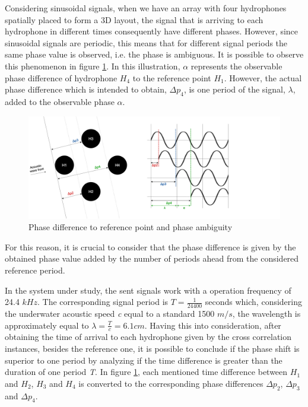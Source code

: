Considering sinusoidal signals, when we have an array with four hydrophones spatially placed to form a 3D layout, the signal that is arriving to each  hydrophone in different times consequently have different phases. However, since sinusoidal signals are periodic, this means that for different signal periods the same phase value is observed, i.e. the phase is ambiguous. It is possible to observe this phenomenon in figure \ref{fig:phasediff}. In this illustration, $\alpha$ represents the observable phase difference of hydrophone $H_4$ to the reference point $H_1$. However, the actual phase difference which is intended to obtain, $\Delta p_4$, is one period of the signal, $\lambda$, added to the observable phase $\alpha$.

\begin{figure}[!htbp]
	\centering
	\includegraphics[width=1.2\textwidth]{figures/phase-diff}
	\caption{Phase difference to reference point and phase ambiguity}
	\label{fig:phasediff}
\end{figure}

For this reason, it is crucial to consider that the phase difference is given by the obtained phase value added by the number of periods ahead from the considered reference period.

In the system under study, the sent signals work with a operation frequency of 24.4 $kHz$. The corresponding signal period is $T = \frac{1}{24400} $ seconds which, considering the underwater acoustic speed \textit{c} equal to a standard 1500 $m/s$, the wavelength is approximately equal to $\lambda = \frac{T}{c} = 6.1 cm$. Having this into consideration, after obtaining the time of arrival to each hydrophone given by the cross correlation instances, besides the reference one, it is possible to conclude if the phase shift is superior to one period by analyzing if the time difference is greater than the duration of one period \textit{T}. In figure \ref{fig:phasediff}, each mentioned time difference between $H_1$ and $H_2$, $H_3$ and $H_4$ is converted to the corresponding phase differences $\Delta p_2$, $\Delta p_3$ and $\Delta p_4$.

